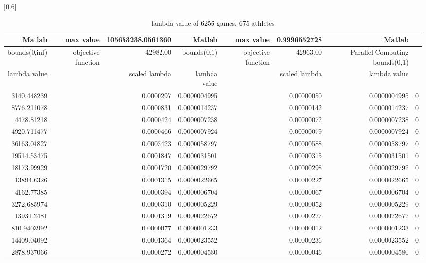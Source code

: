 \documentclass[
journal=jacsat, %
manuscript=article]{achemso}
\begin{document}
\begin{table}[htbp]
  \centering
  \caption{lambda value of 6256 games, 675 athletes}
  \scalebox{0.6}[0.6]{%
    \begin{tabular}{rrrrrrrr}
    \toprule
        Matlab & max value & 105653238.0561360 & Matlab & max value & 0.9996552728 & Matlab \\
    \hline
    bounds(0,inf) & objective function & 42982.00 & bounds(0,1) & objective function & 42963.00 &  Parallel Computing bounds(0,1) \\
    \hline
    lambda value &       & scaled lambda & lambda value  &       & scaled lambda & lambda value  \\
    \bottomrule
    3140.448239 &       & 0.0000297 & 0.0000004995 &       & 0.00000050 & 0.0000004995 & 0 \\
    8776.211078 &       & 0.0000831 & 0.0000014237 &       & 0.00000142 & 0.0000014237 & 0 \\
    4478.81218 &       & 0.0000424 & 0.0000007238 &       & 0.00000072 & 0.0000007238 & 0 \\
    4920.711477 &       & 0.0000466 & 0.0000007924 &       & 0.00000079 & 0.0000007924 & 0 \\
    36163.04827 &       & 0.0003423 & 0.0000058797 &       & 0.00000588 & 0.0000058797 & 0 \\
    19514.53475 &       & 0.0001847 & 0.0000031501 &       & 0.00000315 & 0.0000031501 & 0 \\
    18173.99929 &       & 0.0001720 & 0.0000029792 &       & 0.00000298 & 0.0000029792 & 0 \\
    13894.6326 &       & 0.0001315 & 0.0000022665 &       & 0.00000227 & 0.0000022665 & 0 \\
    4162.77385 &       & 0.0000394 & 0.0000006704 &       & 0.00000067 & 0.0000006704 & 0 \\
    3272.685974 &       & 0.0000310 & 0.0000005229 &       & 0.00000052 & 0.0000005229 & 0 \\
    13931.2481 &       & 0.0001319 & 0.0000022672 &       & 0.00000227 & 0.0000022672 & 0 \\
    810.9403992 &       & 0.0000077 & 0.0000001233 &       & 0.00000012 & 0.0000001233 & 0 \\
    14409.04092 &       & 0.0001364 & 0.0000023552 &       & 0.00000236 & 0.0000023552 & 0 \\
    2878.937066 &       & 0.0000272 & 0.0000004580 &       & 0.00000046 & 0.0000004580 & 0 \\

\end{tabular}}
\end{table}
\end{document}

